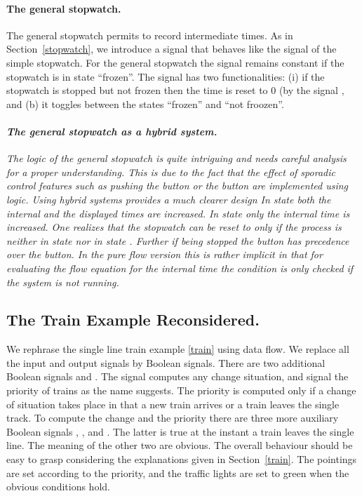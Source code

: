 \paragraph{The general stopwatch.}
The general stopwatch permits to record intermediate times. As in Section~\ref{stopwatch}, we introduce a signal  that behaves like the signal  of the simple stopwatch. For the general stopwatch the signal  remains constant if the stopwatch is in state ``frozen''.  The signal
 has two functionalities: (i) if the stopwatch is stopped but not frozen then the time is reset to $0$ (by the signal , and (b) it toggles between the states ``frozen'' and ``not froozen''.
%
%

\paragraph{\textit{The general stopwatch as a hybrid system.}}
\emph{The logic of the general stopwatch is quite intriguing and needs careful analysis for a proper understanding. This is due to the fact that the effect of sporadic control features such as pushing the \emph{} button or 
the \emph{} button are implemented using logic. Using hybrid systems provides a much clearer design
%
%
In state \emph{} both the internal and the displayed times are increased. In state \emph{} only the internal time is increased. One realizes that the stopwatch can be reset to \emph{} only if the process is neither in state \emph{} nor in state \emph{}. Further if being stopped the \emph{} button has precedence over the \emph{} button. In the pure flow version this is rather implicit in that for evaluating the flow equation for the internal time the \emph{} condition is only checked if the system is not running.}

\subsection{The Train Example Reconsidered.}\label{train-flow}
We rephrase the single line train example \ref{train} using data 
flow. We replace all the input and output signals by Boolean signals.  
There are two additional Boolean signals  and 
. The signal  computes any change 
situation, and signal  the priority of trains 
as the name suggests. The priority is computed only if a change of 
situation takes place in that a new train arrives or a train leaves 
the single track.
To compute the change and the priority there are three more auxiliary 
Boolean signals , 
, and . The latter is true at the 
instant a train leaves the single line. The meaning of the other two 
are obvious. 
% 
%
The overall behaviour should be easy to grasp considering the 
explanations
given in Section~\ref{train}. The pointings are set according to the 
priority, and the traffic lights are set to green when the obvious 
conditions hold.

